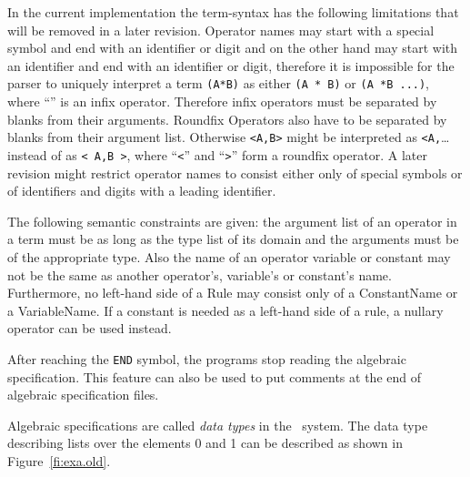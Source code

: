 In the current implementation the term-syntax has the
following limitations that will be removed in a later revision.
Operator names may start with a special symbol and end with an
identifier or digit and on the other hand may start with an identifier
and end with an identifier or digit, therefore
it is impossible for the parser to uniquely interpret a term
\verb+(A*B)+ as  either \verb+(A * B)+ or \verb+(A *B ...)+, where
``{\tt *}'' is an infix operator. Therefore infix operators must be
separated by blanks from their arguments.
Roundfix Operators also have to be separated by blanks from their argument
list. Otherwise \verb+<A,B>+ might be interpreted as \verb+<A,+\ldots
instead of as \verb+< A,B >+, where ``{\tt <}'' and ``{\tt >}'' form a
roundfix operator. A later
revision might restrict operator names to consist either only of
special symbols or of identifiers and digits with a leading
identifier. 

The following 
semantic constraints are given: the argument list of an operator in a term must
be as long as the type list of its domain and the arguments must be of the
appropriate type. Also the name of an operator variable or constant
may not be the same as another operator's, variable's or constant's name.
Furthermore, no left-hand side of a Rule may consist only of a ConstantName
or a VariableName. If a constant is needed as a left-hand side of a
rule, a nullary operator can be used instead. 

After reaching the {\tt END} symbol, the programs stop reading the
algebraic specification. This feature can also be used to put 
comments at the end of algebraic specification files.

Algebraic specifications are called {\em data types} in the \redux\  system.
The data type describing lists over the elements 0 and 1 can be described as
shown in Figure~\ref{fi:exa.old}.

